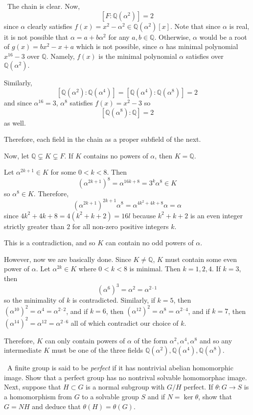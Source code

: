 \documentclass[12pt]{AlgebraQual}
\begin{document}
\begin{solution}$\,$
The chain is clear. Now, $$[F:\mathbb{Q}(\alpha^2)]=2$$ since $\alpha$ clearly satisfies $f(x)=x^2-\alpha^2\in\mathbb{Q}(\alpha^2)[x]$. Note that since $\alpha$ is real, it is not possible that $\alpha=a+b\alpha^2$ for any $a,b\in\mathbb{Q}$. Otherwise, $\alpha$ would be a root of $g(x)=bx^2-x+a$ which is not possible, since $\alpha$ has minimal polynomial $x^{16}-3$ over $\mathbb{Q}$. Namely, $f(x)$ is the minimal polynomial $\alpha$ satisfies over $\mathbb{Q}(\alpha^2).$

Similarly, $$[\mathbb{Q}(\alpha^2):\mathbb{Q}(\alpha^4)]=[\mathbb{Q}(\alpha^4):\mathbb{Q}(\alpha^8)]=2$$ and since $\alpha^{16}=3$, $\alpha^8$ satisfies $f(x)=x^2-3$ so $$[\mathbb{Q}(\alpha^8):\mathbb{Q}]=2$$ as well.

Therefore, each field in the chain as a proper subfield of the next.

Now, let $\mathbb{Q}\subsetneq K\subsetneq F$. If $K$ contains no powers of $\alpha$, then $K=\mathbb{Q}$.

Let $\alpha^{2k+1}\in K$ for some $0<k<8$. Then $$(\alpha^{2k+1})^8=\alpha^{16k+8}=3^k\alpha^8\in K$$ so $\alpha^8\in K$. Therefore, $$(\alpha^{2k+1})^{2k+1}\alpha^8=\alpha^{4k^2+4k+8}\alpha=\alpha$$ since $4k^2+4k+8=4(k^2+k+2)=16l$ because $k^2+k+2$ is an even integer strictly greater than $2$ for all non-zero positive integers $k$.

This is a contradiction, and so $K$ can contain no odd powers of $\alpha$.

However, now we are basically done. Since $K\not=\mathbb{Q}$, $K$ must contain some even power of $\alpha$. Let $\alpha^{2k}\in K$ where $0<k<8$ is minimal. Then $k=1,2,4$.  If $k=3$, then $$(\alpha^6)^3=\alpha^2=\alpha^{2\cdot 1}$$ so the minimality of $k$ is contradicted. Similarly, if $k=5$, then $(\alpha^{10})^2=\alpha^4=\alpha^{2\cdot 2}$, and if $k=6$, then $(\alpha^{12})^2=\alpha^8=\alpha^{2\cdot 4}$, and if $k=7$, then $(\alpha^{14})^2=\alpha^{12}=\alpha^{2\cdot 6}$ all of which contradict our choice of $k.$

Therefore, $K$ can only contain powers of $\alpha$ of the form $\alpha^2,\alpha^4,\alpha^8$ and so any intermediate $K$ must be one of the three fields $\mathbb{Q}(\alpha^2),\mathbb{Q}(\alpha^4),\mathbb{Q}(\alpha^8)$.

\end{solution}
\newpage



\begin{problem} $\,$
A finite group is said to be \textit{perfect} if it has nontrivial abelian homomorphic image. Show that a perfect group has no nontrival solvable homomorphac image. Next, suppose that $H\subset G$ is a normal subgroup with $G/H$ perfect. If $\theta:G\to S$ is a homomorphism from $G$ to a solvable group $S$ and if $N=\ker\theta$, show that $G=NH$ and deduce that $\theta(H)=\theta(G)$.
\end{problem}
\end{document}
